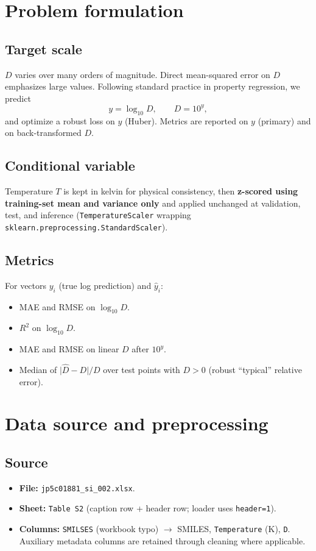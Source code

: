 \documentclass[11pt,a4paper]{article}
\begin{document}
\section{Problem formulation}
\subsection{Target scale}
$D$ varies over many orders of magnitude. Direct mean-squared error on $D$ emphasizes large values. Following standard practice in property regression, we predict
\[
y = \log_{10} D, \qquad D = 10^{y},
\]
and optimize a robust loss on $y$ (Huber). Metrics are reported on $y$ (primary) and on back-transformed $D$.

\subsection{Conditional variable}
Temperature $T$ is kept in kelvin for physical consistency, then \textbf{z-scored using training-set mean and variance only} and applied unchanged at validation, test, and inference (\texttt{TemperatureScaler} wrapping \texttt{sklearn.preprocessing.StandardScaler}).

\subsection{Metrics}
For vectors $y_i$ (true log prediction) and $\hat{y}_i$:
\begin{itemize}
  \item MAE and RMSE on $\log_{10} D$.
  \item $R^2$ on $\log_{10} D$.
  \item MAE and RMSE on linear $D$ after $10^{y}$.
  \item Median of $\lvert \hat{D} - D\rvert / D$ over test points with $D>0$ (robust ``typical'' relative error).
\end{itemize}

\section{Data source and preprocessing}
\subsection{Source}
\begin{itemize}
  \item \textbf{File:} \texttt{jp5c01881\_si\_002.xlsx}.
  \item \textbf{Sheet:} \texttt{Table S2} (caption row + header row; loader uses \texttt{header=1}).
  \item \textbf{Columns:} \texttt{SMILSES} (workbook typo) $\rightarrow$ SMILES, \texttt{Temperature} (K), \texttt{D}. Auxiliary metadata columns are retained through cleaning where applicable.
\end{itemize}
\end{document}
